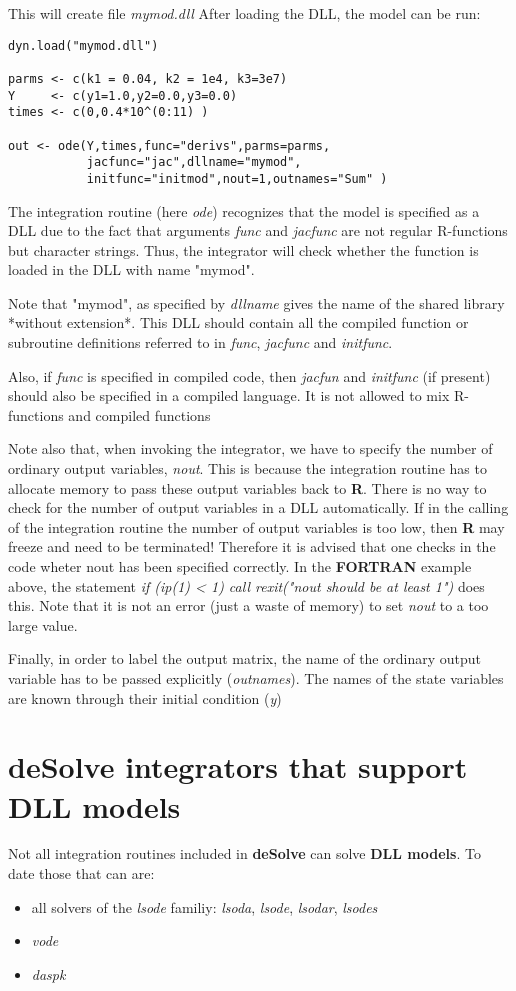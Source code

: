 \documentclass[english]{article}
\newcommand{\R}{\textbf{\textsf{R}}\xspace}
\newcommand{\deSolve}{\textbf{\textsf{deSolve}}\xspace}
\newcommand{\FOR}{\textbf{\textsf{FORTRAN}}\xspace}
\newcommand{\DLLmodels}{\textbf{\textsf{DLL models}}\xspace}
\begin{document}
This will create file \emph{mymod.dll} After loading the DLL, the
model can be run:
\begin{verbatim}
dyn.load("mymod.dll")

parms <- c(k1 = 0.04, k2 = 1e4, k3=3e7)
Y     <- c(y1=1.0,y2=0.0,y3=0.0)
times <- c(0,0.4*10^(0:11) )

out <- ode(Y,times,func="derivs",parms=parms,
           jacfunc="jac",dllname="mymod",
           initfunc="initmod",nout=1,outnames="Sum" )

\end{verbatim}

The integration routine (here \emph{ode}) recognizes that the model is specified
as a DLL due to the fact that arguments \emph{func} and \emph{jacfunc} are not regular R-functions
but character strings. Thus, the integrator will check whether the function is loaded in the DLL
with name "mymod".

Note that "mymod", as specified by \emph{dllname} gives the name of the shared library
*without extension*. This DLL should contain all the compiled function or subroutine
definitions referred to in \emph{func}, \emph{jacfunc} and \emph{initfunc}.

Also, if \emph{func} is specified in compiled code, then \emph{jacfun} and
\emph{initfunc} (if present) should also be specified in a compiled language.
It is not allowed to mix R-functions and compiled functions

Note also that, when invoking the integrator, we have to specify the number of
ordinary output variables, \emph{nout}. This is
because the integration routine has to allocate memory to pass these output variables
back to \R. There is no way to check for the number of output variables in a DLL automatically.
If in the calling of the integration routine the number of output variables is too low,
then \R may freeze and need to be terminated! Therefore it is advised that one
checks in the code wheter nout has been specified correctly.
In the \FOR example above, the statement \emph{if (ip(1) < 1) call rexit("nout should be at least 1") } does this.
Note that it is not an error (just a waste of memory) to set \emph{nout} to a too large value.

Finally, in order to label the output matrix, the name of the ordinary output variable has to be passed explicitly (\emph{outnames}).
The names of the state variables are known through their initial condition (\emph{y})
\section{\deSolve integrators that support DLL models}
Not all integration routines included in \deSolve can solve \DLLmodels. To date those that can are:
\begin{itemize}
\item all solvers of the \emph{lsode} familiy: \emph{lsoda}, \emph{lsode}, \emph{lsodar}, \emph {lsodes}
\item \emph{vode}
\item \emph{daspk}
\end{itemize}
\end{document}
